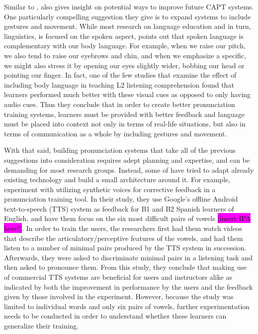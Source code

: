 \documentclass
[
    a4paper,
    twoside,
    12pt,
]
{report}
\begin{document}
Similar to \textcite{neri2002}, \textcite{chun2008} also gives insight
on potential ways to improve future CAPT systems. One particularly
compelling suggestion they give is to expand systems to include gestures
and movement. While most research on language education and in turn,
linguistics, is focused on the spoken aspect, \textcite{chun2008} points
out that spoken language is complementary with our body language. For
example, when we raise our pitch, we also tend to raise our eyebrows and
chin, and when we emphasize a specific, we might also stress it by
opening our eyes slightly wider, bobbing our head or pointing our
finger. In fact, one of the few studies that examine the effect of
including body language in teaching L2 listening comprehension found
that learners performed much better with these visual cues as opposed to
only having audio cues. Thus they conclude that in order to create
better pronunciation training systems, learners must be provided with
better feedback and language must be placed into context not only in
terms of real-life situations, but also in terms of communication as a
whole by including gestures and movement.

With that said, building pronunciation systems that take all of the
previous suggestions into consideration requires adept planning and
expertise, and can be demanding for most research groups. Instead, some
of have tried to adapt already existing technology and build a small
architecture around it. For example, \parencite{tejedor-garcia2017}
experiment with utilizing synthetic voices for corrective feedback in a
pronunciation training tool. In their study, they use Google's offline
Android text-to-speech (TTS) system as feedback for B1 and B2 Spanish
learners of English, and have them focus on the six most difficult pairs
of vowels \colorbox{magenta}{[insert IPA here?]}. In order to train the
users, the researchers first had them watch videos that describe the
articulatory/perceptive features of the vowels, and had them listen to a
number of minimal pairs produced by the TTS system in succession.
Afterwards, they were asked to discriminate minimal pairs in a listening
task and then asked to pronounce them. From this study, they conclude
that making use of commercial TTS systems are beneficial for users and
instructors alike as indicated by both the improvement in performance by
the users and the feedback given by those involved in the experiment.
However, because the study was limited to individual words and only six
pairs of vowels, further experimentation needs to be conducted in order
to understand whether these learners can generalize their training.
\end{document}
